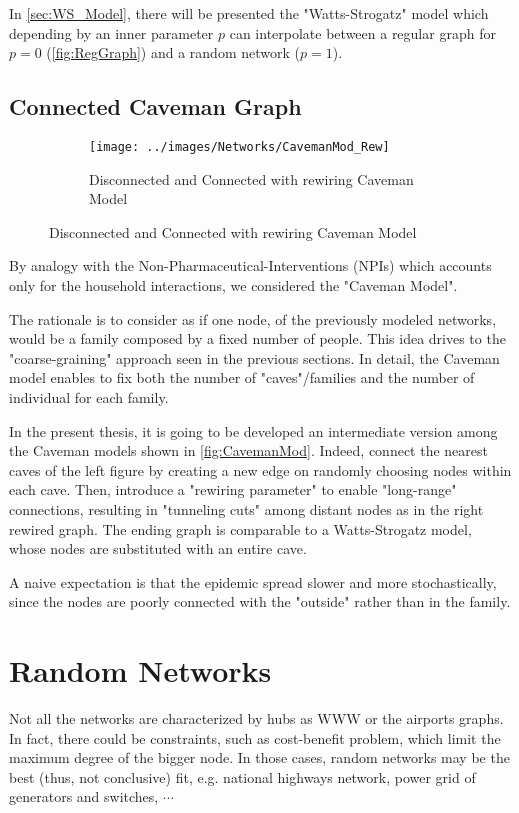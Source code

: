 \documentclass[a4paper,10pt]{book} %
\theoremstyle{definition}
\begin{document}
In \autoref{sec:WS_Model}, there will be presented the "Watts-Strogatz" model which depending by an inner parameter $p$ can interpolate between a regular graph for $p = 0$ (\autoref{fig:RegGraph}) and a random network ($p=1$).

\subsection{Connected Caveman Graph}
\begin{figure}[ht]
    \begin{subfigure}{\textwidth}
        \texttt{[image: ../images/Networks/CavemanMod\_Rew]}
        \centering
        \caption{Disconnected and Connected with rewiring Caveman Model \cite{Taube:2005_IndianSoftwIndustry}}
        \label{fig:CavemanMod}
    \end{subfigure}
\end{figure}

By analogy with the Non-Pharmaceutical-Interventions (NPIs) which accounts only for the household interactions, we considered the "Caveman Model".

The rationale is to consider as if one node, of the previously modeled networks, would be a family composed by a fixed number of people. This idea drives to the "coarse-graining" approach seen in the previous sections.
In detail, the Caveman model enables to fix both the number of "caves"/families and the number of individual for each family. 

In the present thesis, it is going to be developed an intermediate version among the Caveman models shown in \autoref{fig:CavemanMod}. Indeed, connect the nearest caves of the left figure by creating a new edge on randomly choosing nodes within each cave. Then, introduce a "rewiring parameter" to enable "long-range" connections, resulting in "tunneling cuts" among distant nodes as in the right rewired graph. The ending graph is comparable to a Watts-Strogatz model, whose nodes are substituted with an entire cave.

A naive expectation is that the epidemic spread slower and more stochastically, since the nodes are poorly connected with the "outside" rather than in the family.

\section{Random Networks}
Not all the networks are characterized by hubs as WWW or the airports graphs.
In fact, there could be constraints, such as cost-benefit problem, which limit the maximum degree of the bigger node. In those cases, random networks may be the best (thus, not conclusive) fit, e.g. national highways network, power grid of generators and switches, $\cdots$
\end{document}
